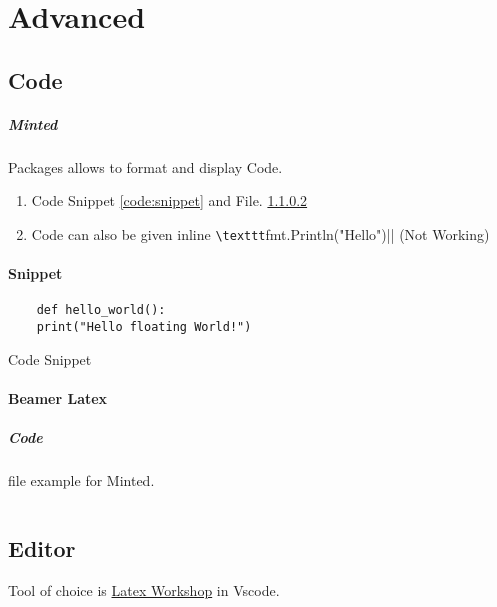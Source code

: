 \documentclass{report}[a4paper,12pt] %
\begin{document}
\chapter{Advanced}
\section{Code}
\paragraph{Minted} Packages allows to format and display Code.

\begin{enumerate}
  \item Code Snippet \ref{code:snippet} and File. \ref{code:file}
  \item Code can also be given inline \verb|\texttt|fmt.Println("Hello")|| (Not Working)
\end{enumerate}

\subsubsection{Snippet}
\begin{listing}[h]
  \begin{verbatim}
    def hello_world():
    print("Hello floating World!")
  \end{verbatim}
  \caption{Code Snippet}
  \label{code:snippet}
\end{listing}

\subsubsection{Beamer Latex}
\label{code:file}
\paragraph{Code} file example for Minted.
\inputminted{tex}{../../presentation/beamer/tutorial.tex} 

\section{Editor}
Tool of choice is \href{https://github.com/James-Yu/LaTeX-Workshop}{Latex Workshop} in Vscode.
\end{document}
